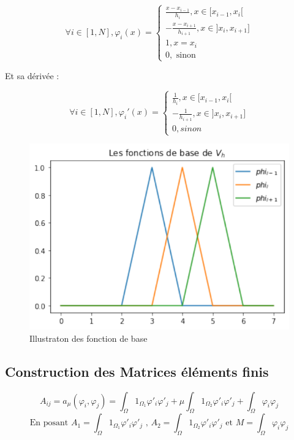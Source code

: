\documentclass[12pt]{article}
\begin{document}
$$
\forall i \in [1,N], 
\varphi_{i} (x) = 
\begin{cases}
\frac{ x-x_{i-1} }{h_{i}} , x \in [x_{i-1},x_{i}[\\
-\frac{ x-x_{i+1} }{h_{i+1} } , x \in ]x_{i},x_{i+1}]  \\
1 , x =  x_{i} \\
0 , \text{ sinon }
\end{cases}
$$


\noindent Et sa dérivée :

$$
\forall i \in [1,N], 
\varphi_{i}'(x) = 
\begin{cases}
\frac{1}{h_{i}} , x \in [x_{i-1},x_{i}[ \\
-\frac{1}{h_{i+1}} , x \in ]x_{i},x_{i+1}]  \\
0 , sinon 
\end{cases}
$$





\begin{figure}[h]
\begin{center}
\includegraphics[scale=1]{fct_baseVh.pdf}
\caption[]{Illustraton des fonction de base}
\end{center}
\end{figure}




\subsection {Construction des Matrices éléments finis}


$$
A_{ij} = a_{\mu}(\varphi _{i} ,\varphi _{j})   
= \int_{\Omega} 1_{\Omega_{1}} \varphi'_{i} \varphi'_{j} + \mu \int_{\Omega}  1_{\Omega_{2}} \varphi'_{i}\varphi'_{j} + \int_{\Omega} \varphi _{i} \varphi_{j}  
$$ 
$$
\text{En posant }  A_{1} = \int_{\Omega} 1_{\Omega_{1}} \varphi'_{i} \varphi'_{j}    \text{ ,  } A_{2} =
\int_{\Omega} 1_{\Omega_{2}} \varphi'_{i} \varphi'_{j} \text{  et  }  M = \int_{\Omega}
\varphi_{i} \varphi_{j}
$$
\end{document}
